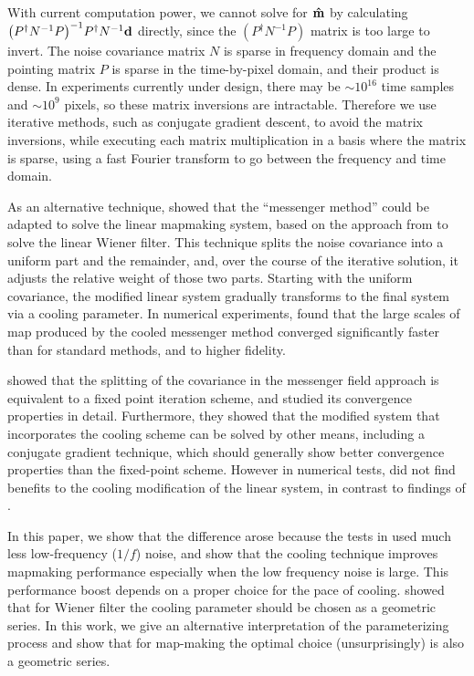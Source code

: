 \documentclass[twocolumn,linenumbers]{aastex631}
\newcommand{\vbd}{\vb{d}}
\newcommand{\inv}[1]{#1^{-1}}
\newcommand{\hatm}{\vb{\hat{m}}}
\newcommand{\Pdagger}{P^{\dagger}}
\newcommand{\PPinv}[1]{\inv{\qty(\Pdagger #1 P)}}
\begin{document}
With current computation power, we cannot solve for $\hatm$
by calculating $\PPinv{\inv{N}} \Pdagger \inv{N} \vbd$ directly, since the $(P^\dag \inv{N}P)$ matrix is too large to invert.  The noise covariance matrix $N$ is sparse in frequency domain and the pointing matrix $P$ is sparse in the time-by-pixel domain, and their product is dense.   In experiments currently under design, there may be $\sim 10^{16}$ time samples and $\sim 10^{9}$ pixels, so these matrix inversions are intractable.
Therefore we use iterative methods, such as conjugate gradient descent, to avoid the matrix inversions, while executing each matrix multiplication in a basis where the matrix is sparse, using a fast Fourier transform to go between the frequency and time domain.

As an alternative technique, \citet{Huffenberger_2018} showed that the ``messenger method'' could be adapted to solve the linear mapmaking system, based on the  approach from \cite{2013A&A...549A.111E} to solve the linear Wiener filter.  This technique splits the noise covariance into a uniform part and the remainder, and, over the course of the iterative solution, it adjusts the relative weight of those two parts.  Starting with the uniform covariance, the modified linear system gradually transforms to the final system via a cooling parameter.  In numerical experiments, \citet{Huffenberger_2018} found that the large scales of map produced by the cooled messenger method converged significantly faster than for standard methods, and to higher fidelity.  

\citet{2018A&A...620A..59P} showed that the splitting of the covariance in the messenger field approach is equivalent to a fixed point iteration scheme, and studied its convergence properties in detail.  Furthermore, they showed that the modified system that incorporates the cooling scheme can be solved by other means, including a conjugate gradient technique, which should generally show better convergence properties than the fixed-point scheme. However in numerical tests, \citet{2018A&A...620A..59P} did not find benefits to the cooling modification of the linear system, in contrast to findings of \citet{Huffenberger_2018}.

In this paper, we show that the difference arose because  the tests in \citet{2018A&A...620A..59P} used much less low-frequency ($1/f$) noise, and show that the cooling technique improves mapmaking performance especially when the low frequency noise is large.  This performance boost depends on a proper choice for the pace of cooling.  \citet{2017MNRAS.468.1782K} showed that for Wiener filter the cooling parameter should be chosen as a geometric series.  In this work, we give an alternative interpretation of the parameterizing process and show that for map-making the optimal choice (unsurprisingly) is also a geometric series.
\end{document}
